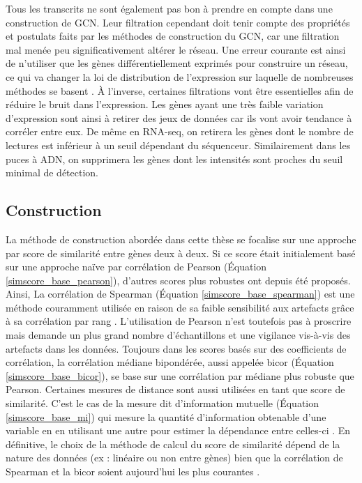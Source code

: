 Tous les transcrits ne sont également pas bon à prendre en compte dans une construction de \acrshort{GCN}. Leur filtration cependant doit tenir compte des propriétés et postulats faits par les méthodes de construction du \acrshort{GCN}, car une filtration mal menée peu significativement altérer le réseau. Une erreur courante est ainsi de n'utiliser que les gènes différentiellement exprimés pour construire un réseau, ce qui va changer la loi de distribution de l'expression sur laquelle de nombreuses méthodes se basent \cite{Zhang2005a}. À l'inverse, certaines filtrations vont être essentielles afin de réduire le bruit dans l'expression. Les gènes ayant une très faible variation d'expression sont ainsi à retirer des jeux de données car ils vont avoir tendance à corréler entre eux. De même en RNA-seq, on retirera les gènes dont le nombre de lectures est inférieur à un seuil dépendant du séquenceur. Similairement dans les puces à ADN, on supprimera les gènes dont les intensités sont proches du seuil minimal de détection. 



\subsection{Construction}

La méthode de construction abordée dans cette thèse se focalise sur une approche par score de similarité entre gènes deux à deux. Si ce score était initialement basé sur une approche naïve par corrélation de Pearson \cite{Carter2004} (Équation \ref{simscore_base_pearson}), d'autres scores plus robustes ont depuis été proposés. Ainsi, La corrélation de Spearman (Équation \ref{simscore_base_spearman}) est une méthode couramment utilisée en raison de sa faible sensibilité aux artefacts grâce à sa corrélation par rang \cite{Chowdhury2019,Serin2016,Kuehne2017}. L'utilisation de Pearson n'est toutefois pas à proscrire mais demande un plus grand nombre d'échantillons et une vigilance vis-à-vis des artefacts dans les données. Toujours dans les scores basés sur des coefficients de corrélation, la corrélation médiane bipondérée, aussi appelée bicor \cite{Song2012} (Équation \ref{simscore_base_bicor}), se base sur une corrélation par médiane plus robuste que Pearson. Certaines mesures de distance sont aussi utilisées en tant que score de similarité. C'est le cas de la mesure dit d'information mutuelle (Équation \ref{simscore_base_mi}) qui mesure la quantité d'information obtenable d'une variable en en  utilisant une autre pour estimer la dépendance entre celles-ci \cite{Kullback1997}. En définitive, le choix de la méthode de calcul du score de similarité dépend de la nature des données (ex : linéaire ou non entre gènes) bien que la corrélation de Spearman et la bicor soient aujourd'hui les plus courantes \cite{Serin2016}.


